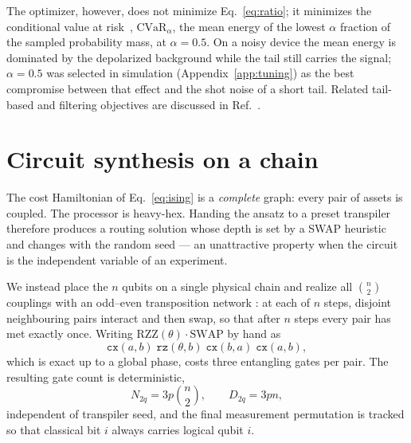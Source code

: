 \documentclass[aps,prx,preprint,superscriptaddress,nofootinbib,longbibliography]{revtex4-2}
\newcommand{\CVaR}{\mathrm{CVaR}}
\newcommand{\Ntwoq}{N_{2q}}
\newcommand{\Dtwoq}{D_{2q}}
\begin{document}
The optimizer, however, does not minimize Eq.~\eqref{eq:ratio}; it minimizes the conditional
value at risk~\cite{barkoutsos2020cvar}, $\CVaR_\alpha$, the mean energy of the lowest
$\alpha$ fraction of the sampled probability mass, at $\alpha = 0.5$. On a noisy device the
mean energy is dominated by the depolarized background while the tail still carries the
signal; $\alpha=0.5$ was selected in simulation (Appendix~\ref{app:tuning}) as the best
compromise between that effect and the shot noise of a short tail. Related tail-based and
filtering objectives are discussed in Ref.~\cite{amaro2022filtering}.

\section{Circuit synthesis on a chain}
\label{sec:circuit}

The cost Hamiltonian of Eq.~\eqref{eq:ising} is a \emph{complete} graph: every pair of assets
is coupled. The processor is heavy-hex. Handing the ansatz to a preset transpiler therefore
produces a routing solution whose depth is set by a SWAP heuristic and changes with the
random seed --- an unattractive property when the circuit is the independent variable of an
experiment.

We instead place the $n$ qubits on a single physical chain and realize all $\binom{n}{2}$
couplings with an odd--even transposition network
\cite{kivlichan2018lineardepth,ogorman2019swapnetworks,weidenfeller2022scaling}: at each of
$n$ steps, disjoint neighbouring pairs interact and then swap, so that after $n$ steps every
pair has met exactly once. Writing $\mathrm{RZZ}(\theta)\cdot\mathrm{SWAP}$ by hand as
\begin{equation}
  \texttt{cx}(a,b)\;\texttt{rz}(\theta,b)\;\texttt{cx}(b,a)\;\texttt{cx}(a,b),
  \label{eq:rzzswap}
\end{equation}
which is exact up to a global phase, costs three entangling gates per pair. The resulting
gate count is deterministic,
\begin{equation}
  \Ntwoq = 3p\binom{n}{2}, \qquad \Dtwoq = 3pn ,
  \label{eq:gatecount}
\end{equation}
independent of transpiler seed, and the final measurement permutation is tracked so that
classical bit $i$ always carries logical qubit $i$.
\end{document}

